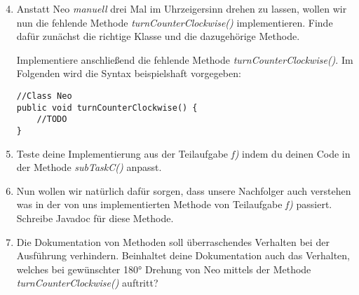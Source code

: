 \begin{enumerate}[label=\alph*)] \setcounter{enumi}{3}
    \item Anstatt Neo \textit{manuell} drei Mal im Uhrzeigersinn drehen zu lassen, wollen wir nun die fehlende Methode \textit{turnCounterClockwise()}
    implementieren. Finde dafür zunächst die richtige Klasse und die dazugehörige Methode. \par
    Implementiere anschließend die fehlende Methode \textit{turnCounterClockwise()}. Im Folgenden wird die Syntax beispielshaft vorgegeben:
    \begin{lstlisting}
//Class Neo
public void turnCounterClockwise() {
    //TODO
}
    \end{lstlisting}
    \item Teste deine Implementierung aus der Teilaufgabe \textit{f)} indem du deinen Code in der Methode \textit{subTaskC()} anpasst.
    \item Nun wollen wir natürlich dafür sorgen, dass unsere Nachfolger auch verstehen was in der von uns implementierten Methode von 
    Teilaufgabe \textit{f)} passiert. Schreibe Javadoc für diese Methode.
    \item Die Dokumentation von Methoden soll überraschendes Verhalten bei der Ausführung verhindern. Beinhaltet deine Dokumentation auch 
    das Verhalten, welches bei gewünschter 180° Drehung von Neo mittels der Methode \textit{turnCounterClockwise()} auftritt?
\end{enumerate}